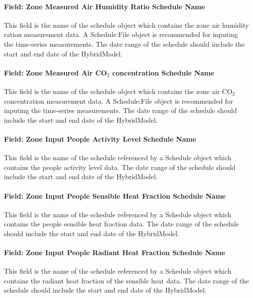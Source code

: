 \paragraph{Field: Zone Measured Air Humidity Ratio Schedule Name}\label{field-zone-measured-air-humidity-ratio-schedule-name-hm}
This field is the name of the schedule object which contains the zone air humidity ration measurement data. A Schedule:File object is recommended for inputing the time-series measurements. The date range of the schedule should include the start and end date of the HybridModel.

\paragraph{Field: Zone Measured Air CO$_2$ concentration Schedule Name}\label{field-zone-measured-air-co2-concentration-schedule-name-hm}
This field is the name of the schedule object which contains the zone air CO$_2$ concentration measurement data. A Schedule:File object is recommended for inputing the time-series measurements. The date range of the schedule should include the start and end date of the HybridModel.

\paragraph{Field: Zone Input People Activity Level Schedule Name}\label{field-zone-input-people-activity-schedule-name-hm}
This field is the name of the schedule referenced by a Schedule object which contains the people activity level data. The date range of the schedule should include the start and end date of the HybridModel.

\paragraph{Field: Zone Input People Sensible Heat Fraction Schedule Name}\label{field-zone-input-people-sensible-heat-fraction-schedule-name-hm}
This field is the name of the schedule referenced by a Schedule object which contains the people sensible heat fraction data. The date range of the schedule should include the start and end date of the HybridModel.

\paragraph{Field: Zone Input People Radiant Heat Fraction Schedule Name}\label{field-zone-input-people-radiant-heat-fraction-schedule-name-hm}
This field is the name of the schedule referenced by a Schedule object which contains the radiant heat fraction of the sensible heat data. The date range of the schedule should include the start and end date of the HybridModel.

